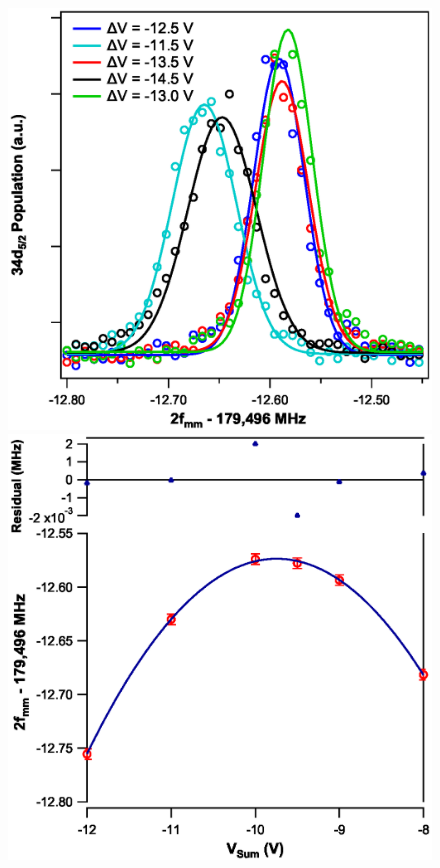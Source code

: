 \documentclass[landscape]{sciposter}
\begin{document}
\begin{multicols}{4}
\begin{figure}
\begin{center}
\includegraphics[scale = 0.8]{nulling.eps}
\includegraphics[scale = 0.8]{sumV.eps}

\end{center}
\end{figure}
\end{multicols}
\end{document}
